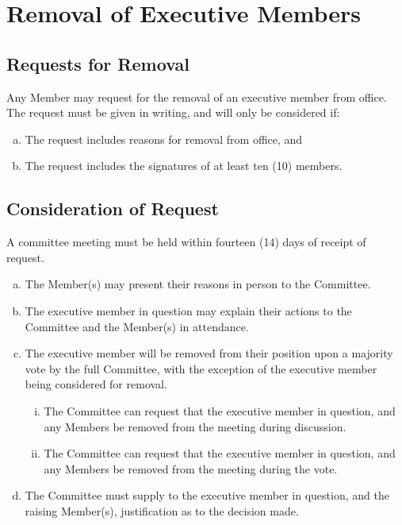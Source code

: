 \documentclass[a4paper,12pt]{article}
\begin{document}
\section{Removal of Executive Members}

\subsection{Requests for Removal}

Any Member may request for the removal of an executive member from office. The request must be given in writing, and will only be considered if:

\begin{enumerate}[a)]
	\item The request includes reasons for removal from office, and
	\item The request includes the signatures of at least ten (10) members.
\end{enumerate}

\subsection{Consideration of Request}

A committee meeting must be held within fourteen (14) days of receipt of request.

\begin{enumerate}[a)]
	\item The Member(s) may present their reasons in person to the Committee.
	\item The executive member in question may explain their actions to the Committee and the Member(s) in attendance.
	\item The executive member will be removed from their position upon a majority vote by the full Committee, with the exception of the executive member being considered for removal.
	\begin{enumerate}[i)]
		\item The Committee can request that the executive member in question, and any Members be removed from the meeting during discussion.
		\item The Committee can request that the executive member in question, and any Members be removed from the meeting during the vote.
	\end{enumerate}
	\item The Committee must supply to the executive member in question, and the raising Member(s), justification as to the decision made.
\end{enumerate}
\end{document}

